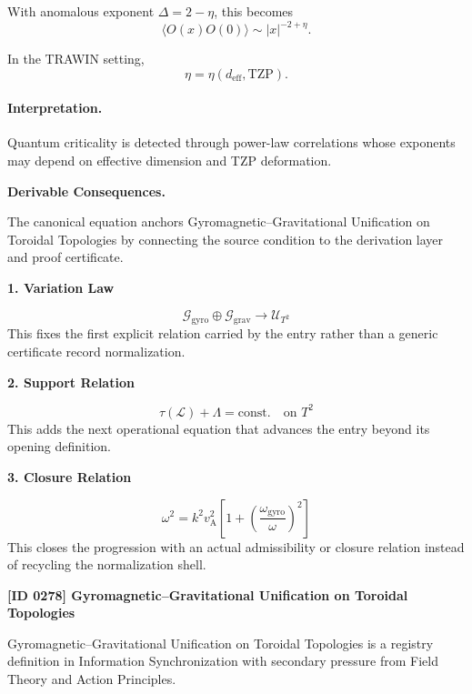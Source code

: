 With anomalous exponent $\Delta=2-\eta$, this becomes
\begin{equation}
\boxed{
\langle O(x)O(0)\rangle
\sim
|x|^{-2+\eta}.
}
\end{equation}

In the TRAWIN setting,
\begin{equation}
\eta=\eta(d_{\mathrm{eff}},\mathrm{TZP}).
\end{equation}

\paragraph{Interpretation.}
Quantum criticality is detected through power-law correlations whose exponents may depend on effective dimension and TZP deformation.

\par\vspace{0.35em}
\noindent\textbf{Derivable Consequences.}\quad
\begingroup
\footnotesize
\raggedright
The canonical equation anchors Gyromagnetic--Gravitational Unification on Toroidal Topologies by connecting the source condition to the derivation layer and proof certificate.
\par\endgroup

\noindent\textbf{1. Variation Law}\par
\[
\mathcal{G}_{\mathrm{gyro}}\oplus\mathcal{G}_{\mathrm{grav}}
\longrightarrow
\mathcal{U}_{T^{2}}
\]
\noindent This fixes the first explicit relation carried by the entry rather than a generic certificate record normalization.\par
\noindent\textbf{2. Support Relation}\par
\[
\tau(\mathcal{L})+\Lambda=\mathrm{const.}\quad\text{on }T^{2}
\]
\noindent This adds the next operational equation that advances the entry beyond its opening definition.\par
\noindent\textbf{3. Closure Relation}\par
\[
\omega^{2} = k^{2} v_{\mathrm{A}}^{2}\left[1 + \left(\frac{\omega_{\mathrm{gyro}}}{\omega}\right)^{2}\right]
\]
\noindent This closes the progression with an actual admissibility or closure relation instead of recycling the normalization shell.\par

\clearpage
\noindent\textbf{[ID 0278] Gyromagnetic--Gravitational Unification on Toroidal Topologies}\par
\vspace{0.35em}
\begingroup\small
{}
Gyromagnetic--Gravitational Unification on Toroidal Topologies is a registry definition in Information Synchronization with secondary pressure from Field Theory and Action Principles.

